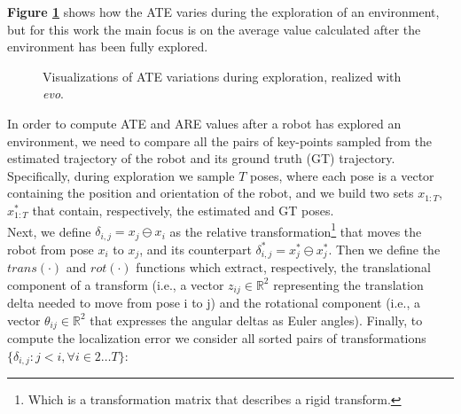 \textbf{Figure \ref{fig:APE_graphs}} shows how the ATE varies during the exploration of an environment, but for this work the main focus is on the average value calculated after the environment has been fully explored.
\begin{figure}[ht!]
    \centering
        \hfill
    \caption{Visualizations of ATE variations during exploration, realized with \textit{evo}\protect\footnotemark.}\label{fig:APE_graphs}
    \end{figure}

\noindent
In order to compute ATE and ARE values after a robot has explored an environment, we need to compare all the pairs of key-points sampled from the estimated trajectory of the robot and its ground truth (GT) trajectory. Specifically, during exploration we sample $T$ poses, where each pose is a vector containing the position and orientation of the robot, and we build two sets $x_{1:T}$, $x_{1:T}^*$ that contain, respectively, the estimated and GT poses. \\
Next, we define $\delta_{i,j} = x_j\ominus x_i$ as the relative transformation\footnote{Which is a transformation matrix that describes a rigid transform.} that moves the robot from pose $x_i$ to $x_j$, and its counterpart $\delta_{i,j}^* = x_j^*\ominus x_j^*$. Then we define the $trans(\cdot)$ and $rot(\cdot)$ functions which extract, respectively, the translational component of a transform (i.e., a vector $z_{ij}\in\mathbb{R}^2$ representing the translation delta needed to move from pose i to j) and the rotational component (i.e., a vector $\theta_{ij}\in\mathbb{R}^2$ that expresses the angular deltas as Euler angles).
Finally, to compute the localization error we consider all sorted pairs of transformations $\{\delta_{i,j} : j < i, \forall i\in2\dots T\}$:

